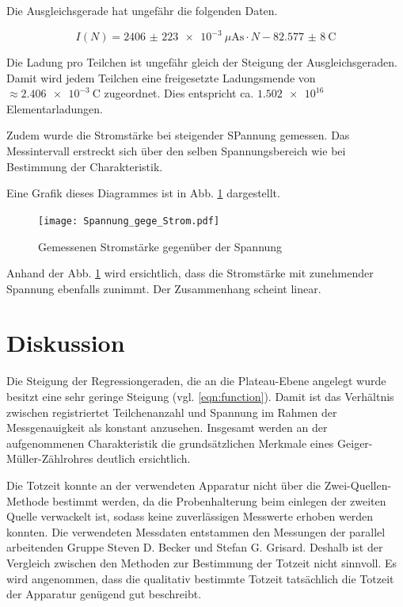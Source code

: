 Die Ausgleichsgerade hat ungefähr die folgenden Daten.

\begin{equation}
  \label{eqn:Augleichsgerade_Ladung}
  I(N) = \SI{2406(223)e-3}{\mu\ampere\second}\cdot N - \SI{82,577(8)}{\coulomb}
\end{equation}

Die Ladung pro Teilchen ist ungefähr gleich der Steigung der Ausgleichsgeraden.
Damit wird jedem Teilchen eine freigesetzte Ladungsmende von $\approx \SI{2,406e-3}{\coulomb}$
zugeordnet. Dies entspricht ca. $\num{1,502e16}$ Elementarladungen.

Zudem wurde die Stromstärke bei steigender SPannung gemessen. Das Messintervall
erstreckt sich über den selben Spannungsbereich wie bei Bestimmung der Charakteristik.

Eine Grafik dieses Diagrammes ist in Abb. \ref{fig:Spannung gegen Strom}
dargestellt.

\begin{figure}
  \centering
  \texttt{[image: Spannung\_gege\_Strom.pdf]}
  \caption{Gemessenen Stromstärke gegenüber der Spannung}
  \label{fig:Spannung gegen Strom}
\end{figure}

Anhand der Abb. \ref{fig:Spannung gegen Strom} wird ersichtlich, dass die Stromstärke
mit zunehmender Spannung ebenfalls zunimmt. Der Zusammenhang scheint linear.

\section{Diskussion}

Die Steigung der Regressiongeraden, die an die Plateau-Ebene angelegt wurde
besitzt eine sehr geringe Steigung (vgl. \ref{eqn:function}).
Damit ist das Verhältnis zwischen registriertet Teilchenanzahl und Spannung
im Rahmen der Messgenauigkeit als konstant anzusehen. Insgesamt werden
an der aufgenommenen Charakteristik die grundsätzlichen Merkmale eines
Geiger-Müller-Zählrohres deutlich ersichtlich.

Die Totzeit konnte an der verwendeten Apparatur nicht über die Zwei-Quellen-Methode
bestimmt werden, da die Probenhalterung beim einlegen der zweiten Quelle
verwackelt ist, sodass keine zuverlässigen Messwerte erhoben werden konnten.
Die verwendeten Messdaten entstammen den Messungen der parallel arbeitenden
Gruppe Steven D. Becker und Stefan G. Grisard.
Deshalb ist der Vergleich zwischen den Methoden zur Bestimmung der Totzeit
nicht sinnvoll. Es wird angenommen, dass die qualitativ bestimmte
Totzeit tatsächlich die Totzeit der Apparatur genügend gut beschreibt.

